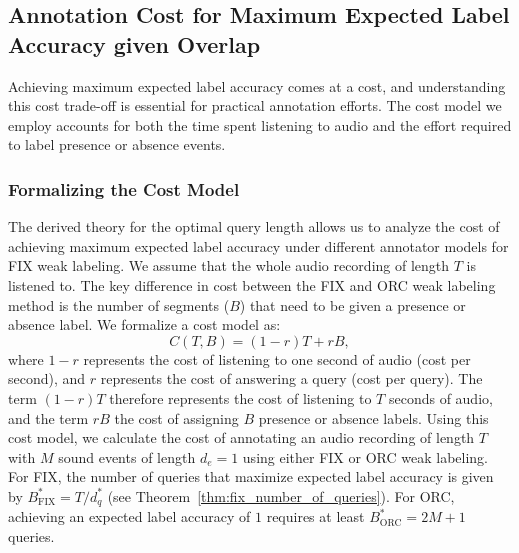 
\subsection{Annotation Cost for Maximum Expected Label Accuracy given Overlap}

Achieving maximum expected label accuracy comes at a cost, and understanding this cost trade-off is essential for practical annotation efforts. The cost model we employ accounts for both the time spent listening to audio and the effort required to label presence or absence events. %

\subsubsection{Formalizing the Cost Model}

The derived theory for the optimal query length allows us to analyze the cost of achieving maximum expected label accuracy under different annotator models for FIX weak labeling. We assume that the whole audio recording of length $T$ is listened to. The key difference in cost between the FIX and ORC weak labeling method is the number of segments ($B$) that need to be given a presence or absence label. We formalize a cost model as:
\begin{equation}
\label{eq:cost}
    C(T, B) = (1-r)T + rB,
\end{equation}
where $1-r$ represents the cost of listening to one second of audio (cost per second), and $r$ represents the cost of answering a query (cost per query). The term $(1-r)T$ therefore represents the cost of listening to $T$ seconds of audio, and the term $rB$ the cost of assigning $B$ presence or absence labels. Using this cost model, we calculate the cost of annotating an audio recording of length $T$ with $M$ sound events of length $d_e=1$ using either FIX or ORC weak labeling. For FIX, the number of queries that maximize expected label accuracy is given by $B^*_{\text{FIX}} = T/d_q^*$ (see Theorem~\ref{thm:fix_number_of_queries}). For ORC, achieving an expected label accuracy of $1$ requires at least $B^*_{\text{ORC}} = 2M+1$ queries.

